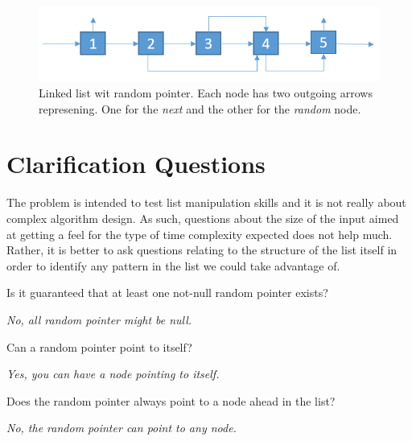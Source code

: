 \begin{figure}
	\label{fig:clone_list_random_pointer:list1}
	\centering
	\includegraphics[scale=0.6]{sources/clone_list_random_pointer/images/random_list_1}
	\caption{Linked list wit random pointer. Each node has two outgoing arrows represening. One for the \textit{next} and the other for the \textit{random} node.}
\end{figure}


\section{Clarification Questions}
The problem is intended to test list manipulation skills and it is not really about complex algorithm design.
As such,  questions about the size of the input aimed at getting a feel for the type of time complexity expected does not help much.
Rather, it is better to ask questions relating to the structure of the list itself in order to identify any pattern in the list we could take advantage of.

\begin{QandA}
	\item \begin{questionitem} \begin{question} Is it guaranteed that at least one not-null random pointer exists?  \end{question} 	 
    \begin{answered}
		\textit{No, all random pointer might be null.}
	\end{answered} \end{questionitem}
	\item \begin{questionitem} \begin{question} Can a random pointer point to itself?  \end{question} 	 
    \begin{answered}
		\textit{Yes, you can have a node pointing to itself.}
	\end{answered} \end{questionitem}

	\item \begin{questionitem} \begin{question} Does the random pointer always point to a node ahead in the list?  \end{question} 	 
		\begin{answered}
			\textit{No, the random pointer can point to any node.}
		\end{answered} \end{questionitem}
	
\end{QandA}

